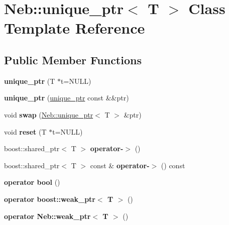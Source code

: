 \hypertarget{classNeb_1_1unique__ptr}{\section{\-Neb\-:\-:unique\-\_\-ptr$<$ \-T $>$ \-Class \-Template \-Reference}
\label{classNeb_1_1unique__ptr}
}
\subsection*{\-Public \-Member \-Functions}
\begin{DoxyCompactItemize}
\item 
\hypertarget{classNeb_1_1unique__ptr_ab549dc5789b1ec0786538fd93a1378cb}{{\bfseries unique\-\_\-ptr} (\-T $\ast$t=\-N\-U\-L\-L)}\label{classNeb_1_1unique__ptr_ab549dc5789b1ec0786538fd93a1378cb}

\item 
\hypertarget{classNeb_1_1unique__ptr_afa78e9899c9c748b5f269cd3b3ecb8fd}{{\bfseries unique\-\_\-ptr} (\hyperlink{classNeb_1_1unique__ptr}{unique\-\_\-ptr} const \&\&ptr)}\label{classNeb_1_1unique__ptr_afa78e9899c9c748b5f269cd3b3ecb8fd}

\item 
\hypertarget{classNeb_1_1unique__ptr_a3c9f699604852a570044b19a6984f096}{void {\bfseries swap} (\hyperlink{classNeb_1_1unique__ptr}{\-Neb\-::unique\-\_\-ptr}$<$ \-T $>$ \&ptr)}\label{classNeb_1_1unique__ptr_a3c9f699604852a570044b19a6984f096}

\item 
\hypertarget{classNeb_1_1unique__ptr_ae0e196e2210b06cd645da9030a51503a}{void {\bfseries reset} (\-T $\ast$t=\-N\-U\-L\-L)}\label{classNeb_1_1unique__ptr_ae0e196e2210b06cd645da9030a51503a}

\item 
\hypertarget{classNeb_1_1unique__ptr_aa488bf338cd935decccc66e2b9c96d0b}{boost\-::shared\-\_\-ptr$<$ \-T $>$ {\bfseries operator-\/$>$} ()}\label{classNeb_1_1unique__ptr_aa488bf338cd935decccc66e2b9c96d0b}

\item 
\hypertarget{classNeb_1_1unique__ptr_a4ca75f1d46551e5ae268e94bdc242cf2}{boost\-::shared\-\_\-ptr$<$ \-T $>$ const \& {\bfseries operator-\/$>$} () const }\label{classNeb_1_1unique__ptr_a4ca75f1d46551e5ae268e94bdc242cf2}

\item 
\hypertarget{classNeb_1_1unique__ptr_a299f10b1de2b1c37d3795753eecdf632}{{\bfseries operator bool} ()}\label{classNeb_1_1unique__ptr_a299f10b1de2b1c37d3795753eecdf632}

\item 
\hypertarget{classNeb_1_1unique__ptr_a1b178172f5769aff9f266ff845158a09}{{\bfseries operator boost\-::weak\-\_\-ptr$<$ T $>$} ()}\label{classNeb_1_1unique__ptr_a1b178172f5769aff9f266ff845158a09}

\item 
\hypertarget{classNeb_1_1unique__ptr_a6e2cd02db8e6e2a088a4c65733833bc0}{{\bfseries operator Neb\-::weak\-\_\-ptr$<$ T $>$} ()}\label{classNeb_1_1unique__ptr_a6e2cd02db8e6e2a088a4c65733833bc0}

\end{DoxyCompactItemize}

